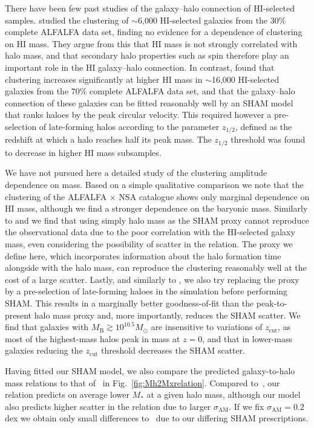 \documentclass[usenatbib,useAMS]{mnras}
\newcommand{\zcut}{\ensuremath{z_{\mathrm{cut}}}}
\newcommand{\HI}{\ensuremath{\mathrm{H}\scriptstyle\mathrm{I}}}
\newcommand{\matched}{ALFALFA $\times$ NSA }
\begin{document}
There have been few past studies of the galaxy--halo connection of $\HI$-selected samples. \citet{Papastergis_HIclust} studied the clustering of $\sim$6,000 $\HI$-selected galaxies from the $30\%$ complete ALFALFA data set, finding no evidence for a dependence of clustering on $\HI$ mass. They argue from this that $\HI$ mass is not strongly correlated with halo mass, and that secondary halo properties such as spin therefore play an important role in the $\HI$ galaxy--halo connection. In contrast, \citet{Guo} found that clustering increases significantly at higher $\HI$ mass in $\sim$16,000 $\HI$-selected galaxies from the $70\%$ complete ALFALFA data set, and that the galaxy--halo connection of these galaxies can be fitted reasonably well by an \ac{SHAM} model that ranks haloes by the peak circular velocity. This required however a pre-selection of late-forming halos according to the parameter $z_{1/2}$, defined as the redshift at which a halo reaches half its peak mass. The $z_{1/2}$ threshold was found to decrease in higher $\HI$ mass subsamples.

We have not pursued here a detailed study of the clustering amplitude dependence on mass. Based on a simple qualitative comparison we note that the clustering of the \matched catalogue shows only marginal dependence on $\HI$ mass, although we find a stronger dependence on the baryonic mass. Similarly to \citet{Papastergis_HIclust} and \citet{Guo} we find that using simply halo mass as the \ac{SHAM} proxy cannot reproduce the observational data due to the poor correlation with the $\HI$-selected galaxy mass, even considering the possibility of scatter in the relation. The proxy we define here, which incorporates information about the halo formation time alongside with the halo mass, can reproduce the clustering reasonably well at the cost of a large scatter. Lastly, and similarly to \citet{Guo}, we also try replacing the proxy by a pre-selection of late-forming haloes in the simulation before performing \ac{SHAM}. This results in a marginally better goodness-of-fit than the peak-to-present halo mass proxy and, more importantly, reduces the \ac{SHAM} scatter. We find that galaxies with $M_{\mathrm{B}} \gtrsim 10^{10.5} M_\odot$ are insensitive to variations of $\zcut$, as most of the highest-mass halos peak in mass at $z=0$, and that in lower-mass galaxies reducing the $\zcut$ threshold decreases the \ac{SHAM} scatter.

Having fitted our \ac{SHAM} model, we also compare the predicted galaxy-to-halo mass relations to that of~\citet{Behroozi2010} in Fig.~\ref{fig:Mh2Mxrelation}. Compared to~\citet{Behroozi2010}, our relation predicts on average lower $M_*$ at a given halo mass, although our model also predicts higher scatter in the relation due to larger $\sigma_\text{AM}$. If we fix $\sigma_\text{AM}=0.2$ dex we obtain only small differences to~\citet{Behroozi2010} due to our differing \ac{SHAM} prescriptions.
\end{document}
